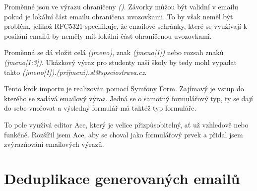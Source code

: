 Proměnné jsou ve výrazu ohraničeny \textit{()}. Závorky můžou být validní v emailu pokud je lokální část emailu ohraničena uvozovkami\cite{wiki-email-address}. To by však neměl být problém, jelikož RFC5321 specifikuje, že emailové schránky, které se využívají k posílání emailů by neměly mít lokální část ohraničenou uvozovkami\cite{rfc5321}.

Proměnná se dá vložit celá \textit{(jmeno)}, znak \textit{(jmeno[1])} nebo rozsah znaků \textit{(jmeno[1:3])}.
Ukázkový výraz pro studenty naší školy by tedy mohl vypadat takto \textit{(jmeno[1]).(prijmeni).st@spseiostrava.cz}.

Tento krok importu je realizován pomocí Symfony Form. Zajímavý je vstup do kterého se zadává emailový výraz. Jedná se o samotný formulářový typ, ty se dají do sebe vnořovat a výsledný formulář má taktéž typ formuláře. 

To pole využívá editor Ace, který je velice přizpůsobitelný, ať už vzhledově nebo funkčně. Rozšířil jsem Ace, aby se choval jako formulářový prvek a přidal jsem zvýrazňování emailových výrazů.
\section{Deduplikace generovaných emailů}

